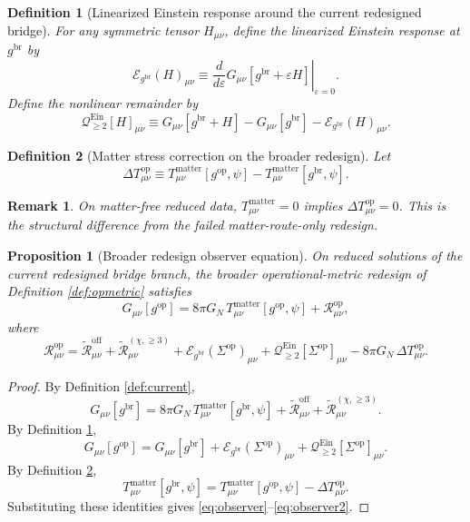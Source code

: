 \documentclass[11pt]{article}
\newcommand{\ReBridge}{g^{\mathrm{br}}}
\newcommand{\OpMetric}{g^{\mathrm{op}}}
\newcommand{\SigmaOp}{\Sigma^{\mathrm{op}}}
\newcommand{\ReLong}{\widetilde{\mathcal R}_{\mu\nu}^{(\chi,\ge 3)}}
\newcommand{\ReOff}{\widetilde{\mathcal R}_{\mu\nu}^{\mathrm{off}}}
\newcommand{\DeltaTop}{\Delta T_{\mu\nu}^{\mathrm{op}}}
\newcommand{\EinLin}{\mathcal E_{\ReBridge}}
\newcommand{\EinQuad}{\mathcal Q_{\ge 2}^{\mathrm{Ein}}}
\newtheorem{definition}{Definition}
\newtheorem{proposition}{Proposition}
\newtheorem{remark}{Remark}
\begin{document}
\begin{definition}[Linearized Einstein response around the current redesigned bridge]
\label{def:einlin}
For any symmetric tensor \(H_{\mu\nu}\), define the linearized Einstein response at \(\ReBridge\) by
\begin{equation}
\EinLin(H)_{\mu\nu}
\equiv
\left.
\frac{d}{d\varepsilon}
G_{\mu\nu}[\ReBridge+\varepsilon H]
\right|_{\varepsilon=0}.
\label{eq:einlin}
\end{equation}
Define the nonlinear remainder by
\begin{equation}
\EinQuad[H]_{\mu\nu}
\equiv
G_{\mu\nu}[\ReBridge+H]
-G_{\mu\nu}[\ReBridge]
-\EinLin(H)_{\mu\nu}.
\label{eq:einquad}
\end{equation}
\end{definition}

\begin{definition}[Matter stress correction on the broader redesign]
\label{def:deltat}
Let
\begin{equation}
\DeltaTop
\equiv
T_{\mu\nu}^{\mathrm{matter}}[\OpMetric,\psi]
-T_{\mu\nu}^{\mathrm{matter}}[\ReBridge,\psi].
\label{eq:deltat}
\end{equation}
\end{definition}

\begin{remark}
On matter-free reduced data, \(T_{\mu\nu}^{\mathrm{matter}}=0\) implies \(\DeltaTop=0\). This is the structural difference from the failed matter-route-only redesign.
\end{remark}

\begin{proposition}[Broader redesign observer equation]
\label{prop:observer}
On reduced solutions of the current redesigned bridge branch, the broader operational-metric redesign of Definition \ref{def:opmetric} satisfies
\begin{equation}
G_{\mu\nu}[\OpMetric]
=
8\pi G_N\,T_{\mu\nu}^{\mathrm{matter}}[\OpMetric,\psi]
+\mathcal R_{\mu\nu}^{\mathrm{op}},
\label{eq:observer}
\end{equation}
where
\begin{equation}
\mathcal R_{\mu\nu}^{\mathrm{op}}
=
\ReOff+\ReLong
+\EinLin(\SigmaOp)_{\mu\nu}
+\EinQuad[\SigmaOp]_{\mu\nu}
-8\pi G_N\,\DeltaTop.
\label{eq:observer2}
\end{equation}
\end{proposition}

\begin{proof}
By Definition \ref{def:current},
\[
G_{\mu\nu}[\ReBridge]
=
8\pi G_N\,T_{\mu\nu}^{\mathrm{matter}}[\ReBridge,\psi]
+\ReOff+\ReLong.
\]
By Definition \ref{def:einlin},
\[
G_{\mu\nu}[\OpMetric]
=
G_{\mu\nu}[\ReBridge]
+\EinLin(\SigmaOp)_{\mu\nu}
+\EinQuad[\SigmaOp]_{\mu\nu}.
\]
By Definition \ref{def:deltat},
\[
T_{\mu\nu}^{\mathrm{matter}}[\ReBridge,\psi]
=
T_{\mu\nu}^{\mathrm{matter}}[\OpMetric,\psi]
-\DeltaTop.
\]
Substituting these identities gives \eqref{eq:observer}--\eqref{eq:observer2}.
\end{proof}
\end{document}
